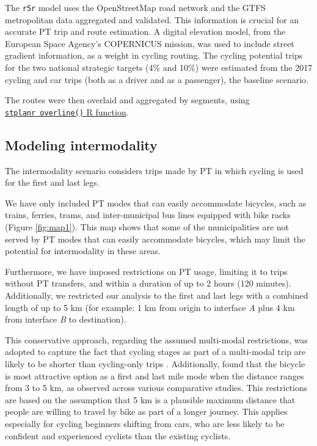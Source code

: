 \documentclass[review, doubleblind, 3p,
authoryear]{elsarticle} %
\begin{document}
The \texttt{r5r} model uses the OpenStreetMap road network and the GTFS
metropolitan data aggregated and validated. This information is crucial
for an accurate PT trip and route estimation. A digital elevation model,
from the European Space Agency's COPERNICUS mission, was used to include
street gradient information, as a weight in cycling routing. The cycling
potential trips for the two national strategic targets (4\% and 10\%)
were estimated from the 2017 cycling and car trips (both as a driver and
as a passenger), the baseline scenario.

The routes were then overlaid and aggregated by segments, using
\href{https://docs.ropensci.org/stplanr/reference/overline.html}{\texttt{stplanr\ overline()}
R function}.

\subsection{Modeling intermodality}\label{modeling-intermodality}

The intermodality scenario considers trips made by PT in which cycling
is used for the first and last legs.

We have only included PT modes that can easily accommodate bicycles,
such as trains, ferries, trams, and inter-municipal bus lines equipped
with bike racks (Figure \ref{fig:map1}). This map shows that some of the
municipalities are not served by PT modes that can easily accommodate
bicycles, which may limit the potential for intermodality in these
areas.

Furthermore, we have imposed restrictions on PT usage, limiting it to
trips without PT transfers, and within a duration of up to 2 hours (120
minutes). Additionally, we restricted our analysis to the first and last
legs with a combined length of up to 5 km (for example: 1 km from origin
to interface \emph{A} plus 4 km from interface \emph{B} to destination).

This conservative approach, regarding the assumed multi-modal
restrictions, was adopted to capture the fact that cycling stages as
part of a multi-modal trip are likely to be shorter than cycling-only
trips \citep{vanmil_insights_2021}. Additionally, \citet{Leferink2017}
found that the bicycle is most attractive option as a first and last
mile mode when the distance ranges from 3 to 5 km, as observed across
various comparative studies. This restrictions are based on the
assumption that 5 km is a plausible maximum distance that people are
willing to travel by bike as part of a longer journey. This applies
especially for cycling beginners shifting from cars, who are less likely
to be confident and experienced cyclists than the existing cyclists.
\end{document}
